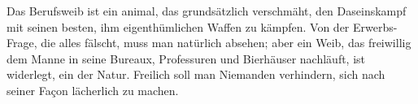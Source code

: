 Das Berufsweib ist ein animal, das grundsätzlich verschmäht, den Daseinskampf mit seinen besten, ihm eigenthümlichen Waffen zu kämpfen. Von der Erwerbs-Frage, die alles fälscht, muss man natürlich absehen; aber ein Weib, das freiwillig dem Manne in seine Bureaux, Professuren und Bierhäuser nachläuft, ist widerlegt, ein  der Natur. Freilich soll man Niemanden verhindern, sich nach seiner Façon lächerlich zu machen.
\par

